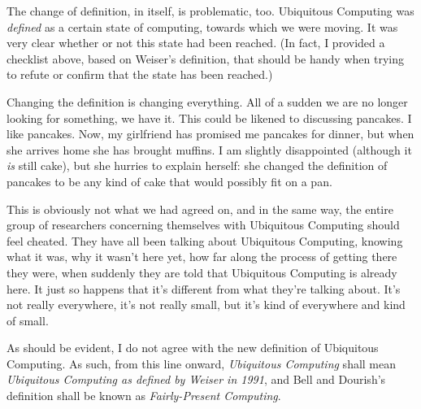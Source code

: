 The change of definition, in itself, is problematic, too. Ubiquitous Computing was \emph{defined} as a certain state
of computing, towards which we were moving. It was very clear whether or not this state had been reached. (In fact,
I provided a checklist above, based on Weiser's definition, that should be handy when trying to refute or confirm that
the state has been reached.)

Changing the definition is changing everything. All of a sudden we are no longer looking
for something, we have it. This could be likened to discussing pancakes. I like pancakes. Now, my girlfriend has
promised me pancakes for dinner, but when she arrives home she has brought muffins. I am slightly disappointed (although
it \emph{is} still cake), but she hurries to explain herself: she changed the definition of pancakes to be any kind
of cake that would possibly fit on a pan.

This is obviously not what we had agreed on, and in the same way, the entire
group of researchers concerning themselves with Ubiquitous Computing should feel cheated. They have all been talking
about Ubiquitous Computing, knowing what it was, why it wasn't here yet, how far along the process of getting there
they were, when suddenly they are told that Ubiquitous Computing is already here. It just so happens that it's different
from what they're talking about. It's not really everywhere, it's not really small, but it's kind of everywhere and kind
of small.

As should be evident, I do not agree with the new definition of Ubiquitous Computing. As such, from this line onward,
\emph{Ubiquitous Computing} shall mean \emph{Ubiquitous Computing as defined by Weiser in 1991}, and Bell and Dourish's
definition shall be known as \emph{Fairly-Present Computing}.
